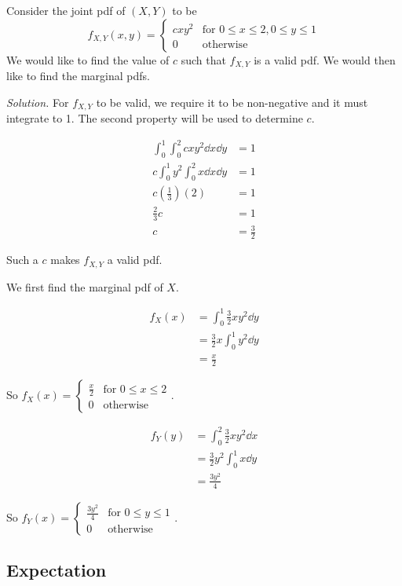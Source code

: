 \begin{example}[]\label{ex:jointpdf_cxy}
	Consider the joint pdf of $(X,Y)$ to be
	$$f_{X,Y}(x,y)=\begin{cases}
		cxy^2 & \text{for $0\leq x\leq 2,0\leq y\leq 1$}\\
		0 & \text{otherwise}
	\end{cases}$$
	We would like to find the value of $c$ such that $f_{X,Y}$ is a valid pdf. We would then like to find the marginal pdfs.

	\textit{Solution.} For $f_{X,Y}$ to be valid, we require it to be non-negative and it must integrate to 1. The second property will be used to determine $c$.

	\begin{align*}
		\int_0^1\int_0^2 cxy^2\dd x\dd y & =1\\
		c\int_0^1y^2\int_0^2 x\dd x\dd y & =1\\
		c\left(\frac 13\right)(2)&=1\\
		\frac 23 c&=1\\
		c&=\frac 32
	\end{align*}

	Such a $c$ makes $f_{X,Y}$ a valid pdf.

	We first find the marginal pdf of $X$.

	\begin{align*}
		f_X(x)&=\int_0^1\frac 32xy^2\dd y\\
		&=\frac 32x\int_0^1y^2\dd y\\
		&=\frac x2
	\end{align*}

	So $f_X(x)=\begin{cases}
		\frac x 2 & \text{for $0\leq x\leq 2$}\\
		0 & \text{otherwise}
	\end{cases}$.

	\begin{align*}
		f_Y(y)&=\int_0^2\frac 32xy^2\dd x\\
		&=\frac 32y^2\int_0^1x\dd y\\
		&=\frac{3y^2}4
	\end{align*}

	So $f_Y(x)=\begin{cases}
		\frac{3y^2}4 & \text{for $0\leq y\leq 1$}\\
		0 & \text{otherwise}
	\end{cases}$.
\end{example}

\subsection{Expectation}

